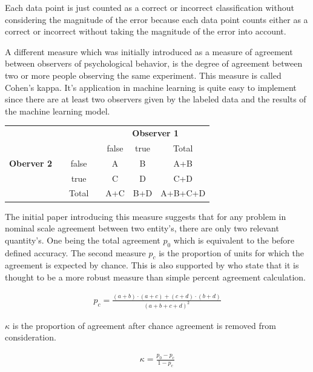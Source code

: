 \documentclass[
a4paper, 
12pt,
grayscalebody, %
abstract=on,
twoside, BCOR10mm, 12pt, DIV13,headinclude, footexclude, final, abstracton, openright
]{ibireprt}
\numberwithin{equation}{chapter}
\numberwithin{table}{chapter}
\numberwithin{figure}{chapter}
\numberwithin{algorithm}{chapter}
\numberwithin{example}{chapter}
\numberwithin{example}{chapter}
\begin{document}
Each data point is just counted as a correct or incorrect classification without considering the magnitude of the error because each data point counts either as a correct or incorrect without taking the magnitude of the error into account. \cite{Dinga2019}

A different measure which was initially introduced as a measure of agreement between observers of psychological behavior, is the degree of agreement between two or more people observing the same experiment. This measure is called Cohen's kappa. It's application in machine learning is quite easy to implement since there are at least two observers given by the labeled data and the results of the machine learning model.


\newcommand{\STAB}[1]{\begin{tabular}{@{}c@{}}#1\end{tabular}}
\begin{center}
	\begin{tabular}{ccccccc}
		\hline
		&&&&\multicolumn{3}{c}{\textbf{Observer 1}}\\
		&&&&false&true&Total\\
		\hline
		\textbf{Oberver 2}&&false& &A &B &A+B \\
		
		&&true&&C&D&C+D\\
				
		&&Total&&A+C&B+D&A+B+C+D\\
	\end{tabular}
\end{center}

The initial paper\cite{Cohen1960} introducing this measure suggests that for any problem in nominal scale agreement between two entity's, there are only two relevant quantity's. One being the total agreement $p_0$ which is equivalent to the before defined accuracy. The second measure $p_c$ is the proportion of units for which the agreement is expected by chance. This is also supported by \cite{Vieira2010} who state that it is thought to be a more robust measure
than simple percent agreement calculation.

\begin{align}
	p_c =\frac{(a+b)\cdot(a+c)+(c+d)\cdot(b+d)}{(a+b+c+d)^2}
\end{align}

$\kappa$ is the proportion of agreement after chance agreement is removed from consideration. 

\begin{align}
	\kappa = \frac{p_0-p_c}{1-p_c}
\end{align}
\end{document}

